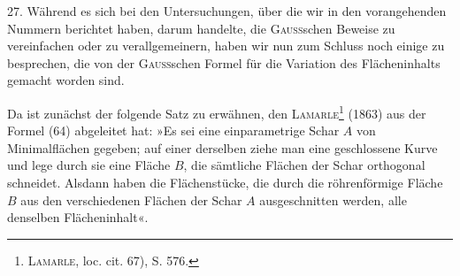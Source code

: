 \clearpage\begingroup\NoSourceHead{}
\renewcommand{\thefootnote}{\arabic{footnote})}\setcounter{footnote}{72}
\noindent\hspace*{\parindent}27. Während es sich bei den Untersuchungen, über die wir in den vorangehenden
Nummern berichtet haben, darum handelte, die \textsc{Gauss}schen Beweise
zu vereinfachen oder zu verallgemeinern, haben wir nun zum Schluss noch
einige  zu besprechen, die von der \textsc{Gauss}schen Formel für
die Variation des Flächeninhalts  gemacht
worden sind.

Da ist zunächst der folgende Satz zu erwähnen, den \textsc{Lamarle}\footnote{\textsc{Lamarle}, loc. cit. 67), S. 576.} (1863)
aus der Formel (64) abgeleitet hat: »Es sei eine einparametrige Schar $A$
von Minimalflächen gegeben; auf einer derselben ziehe man eine geschlossene
Kurve und lege durch sie eine Fläche $B$, die sämtliche Flächen der Schar
orthogonal schneidet. Alsdann haben die Flächenstücke, die durch die röhrenförmige
Fläche $B$ aus den verschiedenen Flächen der Schar $A$ ausgeschnitten
werden, alle denselben Flächeninhalt«.

